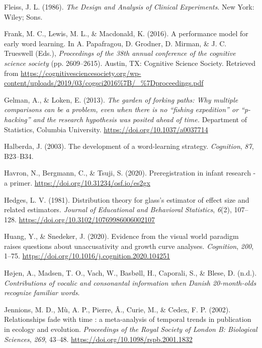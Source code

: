 \documentclass[
  english,
  man, noextraspace]{apa6}
\newlength{\cslhangindent}
\newenvironment{cslreferences}%
  {\setlength{\parindent}{0pt}%
  \everypar{\setlength{\hangindent}{\cslhangindent}}\ignorespaces}%
  {\par}
\begin{document}
\begin{cslreferences}
\leavevmode\hypertarget{ref-Fleiss1986}{}%
Fleiss, J. L. (1986). \emph{The Design and Analysis of Clinical Experiments}. New York: Wiley; Sons.

\leavevmode\hypertarget{ref-Frank2016}{}%
Frank, M. C., Lewis, M. L., \& Macdonald, K. (2016). A performance model for early word learning. In A. Papafragou, D. Grodner, D. Mirman, \& J. C. Trueswell (Eds.), \emph{Proceedings of the 38th annual conference of the cognitive science society} (pp. 2609--2615). Austin, TX: Cognitive Science Society. Retrieved from \url{https://cognitivesciencesociety.org/wp-content/uploads/2019/03/cogsci2016\%7B/_\%7Dproceedings.pdf}

\leavevmode\hypertarget{ref-Gelman2013}{}%
Gelman, A., \& Loken, E. (2013). \emph{The garden of forking paths: Why multiple comparisons can be a problem, even when there is no ``fishing expedition'' or ``p-hacking'' and the research hypothesis was posited ahead of time.} Department of Statistics, Columbia University. \url{https://doi.org/10.1037/a0037714}

\leavevmode\hypertarget{ref-Halberda2003}{}%
Halberda, J. (2003). The development of a word-learning strategy. \emph{Cognition}, \emph{87}, B23--B34.

\leavevmode\hypertarget{ref-Havron}{}%
Havron, N., Bergmann, C., \& Tsuji, S. (2020). Preregistration in infant research - a primer. \url{https://doi.org/10.31234/osf.io/es2gx}

\leavevmode\hypertarget{ref-Hedges1981}{}%
Hedges, L. V. (1981). Distribution theory for glass's estimator of effect size and related estimators. \emph{Journal of Educational and Behavioral Statistics}, \emph{6}(2), 107--128. \url{https://doi.org/10.3102/10769986006002107}

\leavevmode\hypertarget{ref-Huang2020}{}%
Huang, Y., \& Snedeker, J. (2020). Evidence from the visual world paradigm raises questions about unaccusativity and growth curve analyses. \emph{Cognition}, \emph{200}, 1--75. \url{https://doi.org/10.1016/j.cognition.2020.104251}

\leavevmode\hypertarget{ref-Hojen}{}%
Højen, A., Madsen, T. O., Vach, W., Basbøll, H., Caporali, S., \& Blese, D. (n.d.). \emph{Contributions of vocalic and consonantal information when Danish 20-month-olds recognize familiar words}.

\leavevmode\hypertarget{ref-Jennions2002}{}%
Jennions, M. D., Mù, A. P., Pierre, Â., Curie, M., \& Cedex, F. P. (2002). Relationships fade with time : a meta-analysis of temporal trends in publication in ecology and evolution. \emph{Proceedings of the Royal Society of London B: Biological Sciences}, \emph{269}, 43--48. \url{https://doi.org/10.1098/rspb.2001.1832}


\end{cslreferences}
\end{document}
